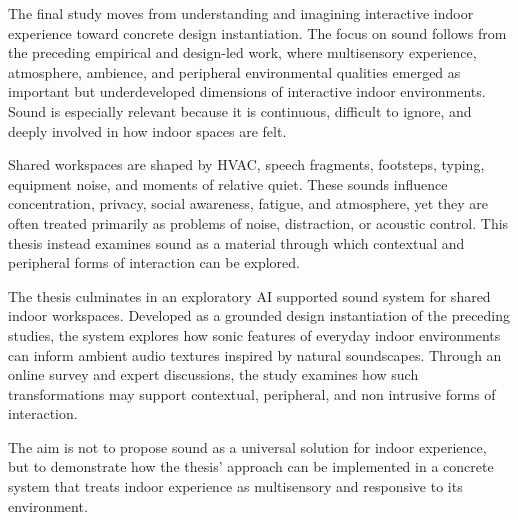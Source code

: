 The final study moves from understanding and imagining interactive indoor experience toward concrete design instantiation. The focus on sound follows from the preceding empirical and design-led work, where multisensory experience, atmosphere, ambience, and peripheral environmental qualities emerged as important but underdeveloped dimensions of interactive indoor environments. Sound is especially relevant because it is continuous, difficult to ignore, and deeply involved in how indoor spaces are felt.

Shared workspaces are shaped by HVAC, speech fragments, footsteps, typing, equipment noise, and moments of relative quiet. These sounds influence concentration, privacy, social awareness, fatigue, and atmosphere, yet they are often treated primarily as problems of noise, distraction, or acoustic control. This thesis instead examines sound as a material through which contextual and peripheral forms of interaction can be explored.

The thesis culminates in an exploratory AI supported sound system for shared indoor workspaces. Developed as a grounded design instantiation of the preceding studies, the system explores how sonic features of everyday indoor environments can inform ambient audio textures inspired by natural soundscapes. Through an online survey and expert discussions, the study examines how such transformations may support contextual, peripheral, and non intrusive forms of interaction.

The aim is not to propose sound as a universal solution for indoor experience, but to demonstrate how the thesis’ approach can be implemented in a concrete system that treats indoor experience as multisensory and responsive to its environment.

